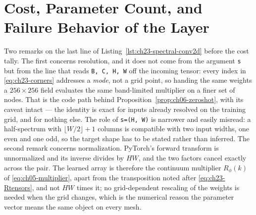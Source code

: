 \section{Cost, Parameter Count, and Failure Behavior of the Layer}
\label{sec:ch23-cost-and-failure}

Two remarks on the last line of Listing~\ref{lst:ch23-spectral-conv2d} before the
cost tally. The first concerns
resolution, and it does not come from the argument \texttt{s} but from the line
that reads \texttt{B, C, H, W} off the incoming tensor: every index in
\eqref{eq:ch23-corners} addresses a \emph{mode}, not a grid point, so handing the
same weights a $256 \times 256$ field evaluates the same band-limited multiplier
on a finer set of nodes. That is the code path behind
Proposition~\ref{prop:ch06-zeroshot}, with its caveat intact --- the identity is
exact for inputs already resolved on the training grid, and for nothing else.
The role of \texttt{s=(H, W)} is narrower and easily misread: a half-spectrum
with $\lfloor W/2 \rfloor + 1$ columns is compatible with two input widths, one
even and one odd, so the target shape has to be stated rather than inferred.
The second remark concerns normalization. PyTorch's forward transform is
unnormalized and its inverse divides by
$HW$, and the two factors cancel exactly across the pair. The learned array is
therefore the continuum multiplier $R_\phi(k)$ of \eqref{eq:ch05-multiplier},
apart from the transposition noted after \eqref{eq:ch23-Rtensors}, and not $HW$
times it; no grid-dependent rescaling of the weights is needed when the
grid changes, which is the numerical reason the parameter vector means the same
object on every mesh.

